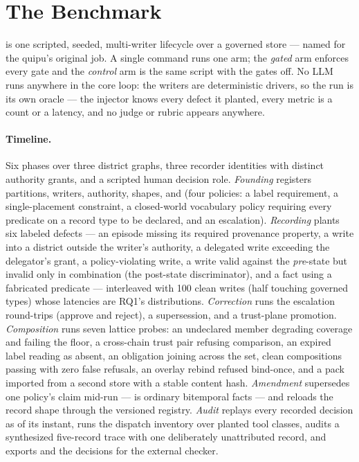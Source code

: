 \section{The \census Benchmark}
\label{sec:census}

\census is one scripted, seeded, multi-writer lifecycle over a
governed store --- named for the quipu's original job. A single command
runs one arm; the \emph{gated} arm enforces every gate and the
\emph{control} arm is the same script with the gates off. No LLM runs
anywhere in the core loop: the writers are deterministic drivers, so
the run is its own oracle --- the injector knows every defect it
planted, every metric is a count or a latency, and no judge or rubric
appears anywhere.

\paragraph{Timeline.}
Six phases over three district graphs, three recorder identities with
distinct authority grants, and a scripted human decision role.
\emph{Founding} registers partitions, writers, authority, shapes, and
\Sig (four policies: a label requirement, a single-placement
constraint, a closed-world vocabulary policy requiring every predicate
on a record type to be declared, and an escalation).
\emph{Recording} plants six labeled defects --- an episode missing its
required provenance property, a write into a district outside the
writer's authority, a delegated write exceeding the delegator's grant,
a policy-violating write, a write valid against the \emph{pre}-state
but invalid only in combination (the post-state discriminator), and a
fact using a fabricated predicate --- interleaved with 100 clean writes
(half touching governed types) whose latencies are RQ1's
distributions. \emph{Correction} runs the escalation round-trips
(approve and reject), a supersession, and a trust-plane promotion.
\emph{Composition} runs seven lattice probes: an undeclared member
degrading coverage and failing the floor, a cross-chain trust pair
refusing comparison, an expired label reading as absent, an obligation
joining across the set, clean compositions passing with zero false
refusals, an overlay rebind refused bind-once, and a pack imported
from a second store with a stable content hash. \emph{Amendment}
supersedes one policy's claim mid-run --- \Sig is ordinary bitemporal
facts --- and reloads the record shape through the versioned registry.
\emph{Audit} replays every recorded decision as of its instant, runs
the dispatch inventory over planted tool classes, audits a
synthesized five-record trace with one deliberately unattributed
record, and exports \Sig and the decisions for the external checker.

